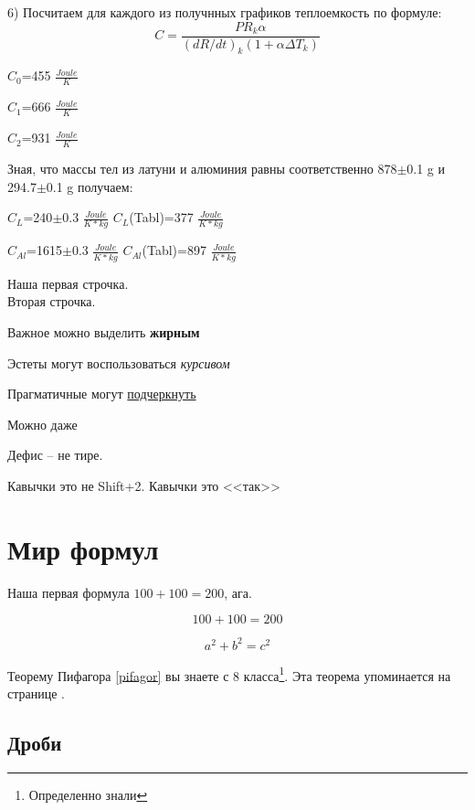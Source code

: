 \documentclass[a4paper,12pt]{article} %
\begin{document}
6) Посчитаем для каждого из получнных графиков теплоемкость по формуле: $$C=\frac{PR_k\alpha}{(dR/dt)_k(1+\alpha\Delta T_k)}$$

$C_0$=455 $\frac{Joule}{K}$

$C_1$=666 $\frac{Joule}{K}$

$C_2$=931 $\frac{Joule}{K}$

Зная, что массы тел из латуни и алюминия равны соответственно 878$\pm$0.1 g и  294.7$\pm$0.1 g  получаем: 

$C_L$=240$\pm$0.3 $\frac{Joule}{K*kg}$ \hspace{40pt} $C_L$(Tabl)=377 $\frac{Joule}{K*kg}$

$C_{Al}$=1615$\pm$0.3 $\frac{Joule}{K*kg}$ \hspace{31pt} $C_{Al}$(Tabl)=897 $\frac{Joule}{K*kg}$
















Наша первая строчка.\\[2cm]
Вторая \hspace{20pt} строчка.

Важное можно выделить \textbf{жирным}

Эстеты могут воспользоваться \textit{курсивом}

Прагматичные могут \underline{подчеркнуть}

Можно даже 

Дефис -- не тире.

Кавычки это не Shift+2. Кавычки это <<так>>

\section{Мир формул}

Наша первая формула $100+100=200$, ага.

\[ 100+100=200 \]

\begin{equation}\label{pifagor}
a^2+b^2=c^2
\end{equation}

Теорему Пифагора \eqref{pifagor} вы знаете с 8 класса\footnote{Определенно знали}. Эта теорема упоминается на странице \pageref{pifagor}.

\subsection{Дроби}
\end{document}
